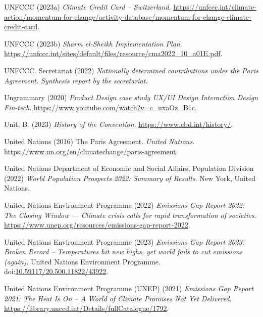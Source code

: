\documentclass[
  letterpaper,
  DIV=11,
  numbers=noendperiod]{scrartcl}
\newlength{\cslhangindent}
\newenvironment{CSLReferences}[2] %
 {\begin{list}{}{%
  \setlength{\itemindent}{0pt}
  \setlength{\leftmargin}{0pt}
  \setlength{\parsep}{0pt}
  \ifodd #1
   \setlength{\leftmargin}{\cslhangindent}
   \setlength{\itemindent}{-1\cslhangindent}
  \fi
  \setlength{\itemsep}{#2\baselineskip}}}
 {\end{list}}
\begin{document}
\begin{CSLReferences}{0}{1}
UNFCCC (2023a) \emph{Climate {Credit Card} -- {Switzerland}}.
\url{https://unfccc.int/climate-action/momentum-for-change/activity-database/momentum-for-change-climate-credit-card}.

UNFCCC (2023b) \emph{Sharm el-{Sheikh Implementation Plan}}.
\url{https://unfccc.int/sites/default/files/resource/cma2022_10_a01E.pdf}.

UNFCCC. Secretariat (2022) \emph{Nationally determined contributions
under the {Paris Agreement}. {Synthesis} report by the secretariat}.

Ungrammary (2020) \emph{Product {Design} case study {\textbar} {UX}/{UI
Design} {\textbar} {Interaction Design} {\textbar} {Fin-tech}}.
\url{https://www.youtube.com/watch?v=c_uxaOz_B1c}.

Unit, B. (2023) \emph{History of the {Convention}}.
\url{https://www.cbd.int/history/}.

United Nations (2016) The {Paris Agreement}. \emph{United Nations}.
\url{https://www.un.org/en/climatechange/paris-agreement}.

United Nations Department of Economic and Social Affairs, Population
Division (2022) \emph{World {Population Prospects} 2022: {Summary} of
{Results}}. New York, United Nations.

United Nations Environment Programme (2022) \emph{Emissions {Gap Report}
2022: {The Closing Window} --- {Climate} crisis calls for rapid
transformation of societies}.
\url{https://www.unep.org/resources/emissions-gap-report-2022}.

United Nations Environment Programme (2023) \emph{Emissions {Gap Report}
2023: {Broken Record} -- {Temperatures} hit new highs, yet world fails
to cut emissions (again)}. United Nations Environment Programme.
doi:\href{https://doi.org/10.59117/20.500.11822/43922}{10.59117/20.500.11822/43922}.

United Nations Environment Programme (UNEP) (2021) \emph{Emissions {Gap
Report} 2021: {The Heat Is On} -- {A World} of {Climate Promises Not Yet
Delivered}}. \url{https://library.unccd.int/Details/fullCatalogue/1792}.


\end{CSLReferences}
\end{document}
